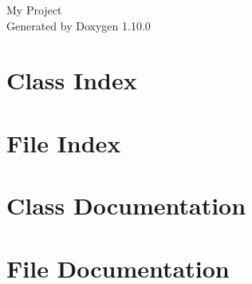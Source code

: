 \documentclass[twoside]{book}
\newcommand{\+}{\discretionary{\mbox{\scriptsize$\hookleftarrow$}}{}{}}
\newcommand{\clearemptydoublepage}{%
    \newpage{\pagestyle{empty}\cleardoublepage}%
  }
\begin{document}
  \raggedbottom
    \hypersetup{pageanchor=false,
                bookmarksnumbered=true,
                pdfencoding=unicode
               }
  \begin{titlepage}
  \vspace*{7cm}
  \begin{center}%
  {\Large My Project}\\
  \vspace*{1cm}
  {\large Generated by Doxygen 1.10.0}\\
  \end{center}
  \end{titlepage}
  \clearemptydoublepage
  \tableofcontents
  \clearemptydoublepage
  \hypersetup{pageanchor=true}
\chapter{Class Index}

\chapter{File Index}

\chapter{Class Documentation}




\chapter{File Documentation}




  \backmatter
  \newpage
  \clearemptydoublepage
  \printindex
\end{document}
